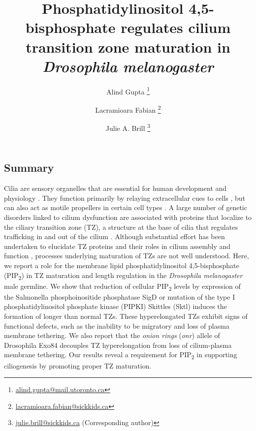 \documentclass[12pt, twoside, letterpaper]{article}
\title{\vspace{-1cm} \bfseries\large Phosphatidylinositol 4,5-bisphosphate regulates cilium transition zone maturation in \textit{Drosophila melanogaster}}
\author[1,2]{Alind Gupta \thanks{\url{alind.gupta@mail.utoronto.ca}}}
\author[2]{Lacramioara Fabian \thanks{\url{lacramioara.fabian@sickkids.ca}}}
\author[1,2]{Julie A. Brill \thanks{\url{julie.brill@sickkids.ca} (Corresponding author)}}
\affil[1]{\small Department of Molecular Genetics, University of Toronto, Toronto, ON M5S 1A8, Canada}
\affil[2]{\small Program in Cell Biology, Hospital for Sick Children, Toronto, ON M5G 1X8, Canada}
\date{}
\newcommand{\PIP}{PIP\textsubscript{2}}
\begin{document}
\maketitle
\raggedbottom
\vspace{-0.5cm}
\begin{doublespacing}
  \begin{linenumbers}
    \section*{Summary}
    Cilia are sensory organelles that are essential for human development
    and physiology \citep{satir2010primary, marshall2006cilia}.
    They function primarily by relaying extracellular cues to cells
    \citep{satir2010primary, bloodgood2010sensory},
    but can also act as motile propellers in certain cell types
    \citep{eley2005cilia}.
    A large number of genetic disorders linked to cilium dysfunction are
    associated with proteins that localize to the ciliary transition zone (TZ),
    a structure at the base of cilia that regulates trafficking in and out
    of the cilium \citep{reiter2012base, szymanska2012transition}.
    Although substantial effort has been undertaken
    to elucidate TZ proteins and their roles in cilium assembly and function
    \citep{gonccalves2017ciliary},
    processes underlying maturation of TZs are not well understood.
    Here, we report a role for the membrane lipid
    phosphatidylinositol 4,5-bisphosphate
    (\PIP{}) in TZ maturation and length regulation
    in the \textit{Drosophila melanogaster} male germline.
    We show that reduction of cellular \PIP{} levels
    by expression of the Salmonella phosphoinositide phosphatase SigD
    or mutation of
    the type I phosphatidylinositol phosphate kinase (PIPKI) Skittles (Sktl)
    induces the formation of longer than normal TZs.
    These hyperelongated TZs exhibit signs of functional defects,
    such as the inability
    to be migratory \citep{basiri2014migrating} and loss of plasma membrane tethering.
    We also report that the \textit{onion rings} (\textit{onr}) allele
    of Drosophila Exo84
    decouples TZ hyperelongation from loss of cilium-plasma membrane tethering.
    Our results reveal a requirement for \PIP{} in supporting ciliogenesis
    by promoting proper TZ maturation.
    

\end{linenumbers}
\end{doublespacing}
\end{document}
